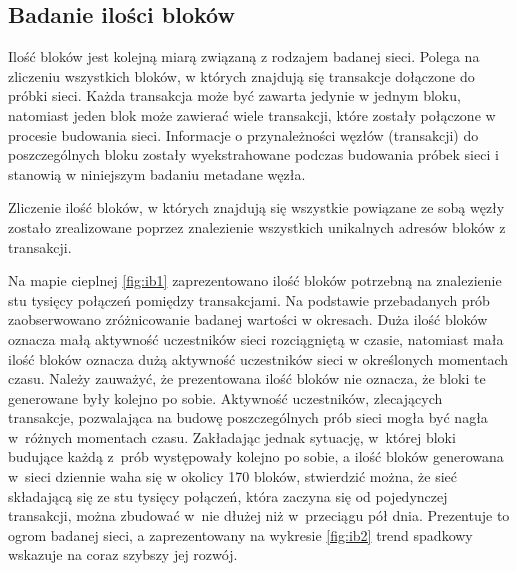 \documentclass[12pt, twoside, final, openany]{mgr}
\begin{document}
\newpage
\subsection{Badanie ilości bloków}
\label{ilosc_blokow}
\indent Ilość bloków jest kolejną miarą związaną z rodzajem badanej sieci. Polega na zliczeniu wszystkich bloków, w których znajdują się transakcje dołączone do próbki sieci. Każda transakcja może być zawarta jedynie w jednym bloku, natomiast jeden blok może zawierać wiele transakcji, które zostały połączone w procesie budowania sieci. Informacje o przynależności węzłów (transakcji) do poszczególnych bloku zostały wyekstrahowane podczas budowania próbek sieci i stanowią w niniejszym badaniu metadane węzła. 

\indent Zliczenie ilość bloków, w których znajdują się wszystkie powiązane ze sobą węzły zostało zrealizowane poprzez znalezienie wszystkich unikalnych adresów bloków z transakcji.

\indent Na mapie cieplnej \ref{fig:ib1} zaprezentowano ilość bloków potrzebną na znalezienie stu tysięcy połączeń pomiędzy transakcjami. Na podstawie przebadanych prób zaobserwowano zróżnicowanie badanej wartości w okresach. Duża ilość bloków oznacza małą aktywność uczestników sieci rozciągniętą w czasie, natomiast mała ilość bloków oznacza dużą aktywność uczestników sieci w określonych momentach czasu. Należy zauważyć, że prezentowana ilość bloków nie oznacza, że bloki te generowane były kolejno po sobie. Aktywność uczestników, zlecających transakcje, pozwalająca na budowę poszczególnych prób sieci mogła być nagła w~różnych momentach czasu. Zakładając jednak sytuację, w~której bloki budujące każdą z~prób występowały kolejno po sobie, a ilość bloków generowana w~sieci dziennie waha się w okolicy 170 bloków, stwierdzić można, że sieć składającą się ze stu tysięcy połączeń, która zaczyna się od pojedynczej transakcji, można zbudować w~nie dłużej niż w~przeciągu pół dnia. Prezentuje to ogrom badanej sieci, a zaprezentowany na wykresie \ref{fig:ib2} trend spadkowy wskazuje na coraz szybszy jej rozwój. 
\end{document}
